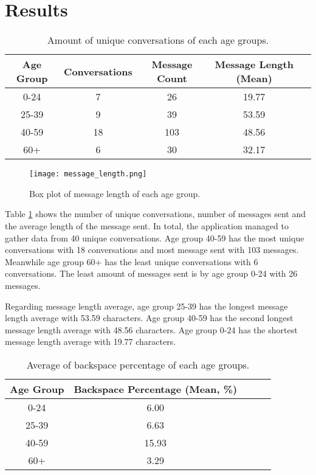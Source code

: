 \section{Results}


\begin{table}[h]
    \centering
    \begin{tabular}{ccccc}
    \toprule
    \textbf{Age Group} & {Conversations} & Message Count & Message Length (Mean) \\
    \midrule
    0-24     & 7 & 26 & 19.77 \\
    25-39    & 9 & 39 & 53.59\\
    40-59    & 18 & 103 & 48.56\\
    60+      & 6 & 30 & 32.17 \\
    \bottomrule
    \end{tabular}
    \caption{Amount of unique conversations of each age groups.}
    \label{tab:unique_conversations}
\end{table}

\begin{figure}[h!]
    \centering
    \texttt{[image: message\_length.png]}
    \caption{Box plot of message length of each age group.}
    \label{box_plot_message_length}
\end{figure}


Table \ref{tab:unique_conversations} shows the number of unique conversations, number of messages sent and the average length of the message sent.
In total, the application managed to gather data from 40 unique conversations.
Age group 40-59 has the most unique conversations with 18 conversations and most message sent with 103 messages.
Meanwhile age group 60+ has the least unique conversations with 6 conversations.
The least amount of messages sent is by age group 0-24 with 26 messages.

Regarding message length average, age group 25-39 has the longest message length average with 53.59 characters.
Age group 40-59 has the second longest message length average with 48.56 characters.
Age group 0-24 has the shortest message length average with 19.77 characters.

\begin{table}[h]
    \centering
    \begin{tabular}{ccccc}
    \toprule
    \textbf{Age Group} & Backspace Percentage (Mean, \%) \\
    \midrule
    0-24     & 6.00 \\
    25-39    & 6.63 \\
    40-59    & 15.93 \\
    60+      & 3.29 \\
    \bottomrule
    \end{tabular}
    \caption{Average of backspace percentage of each age groups.}
    \label{tab:backspace_percentage}
\end{table}

